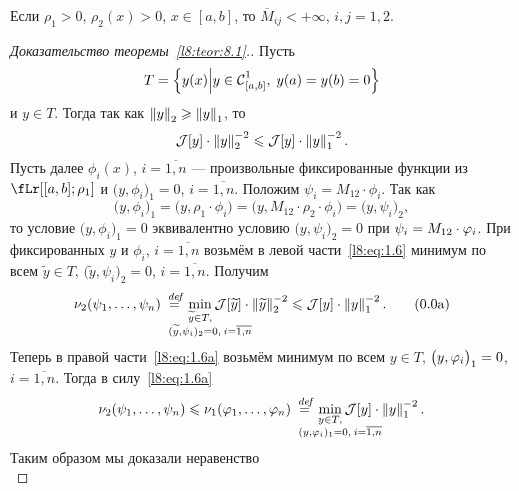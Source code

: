 \begin{_rem}
	Если $\rho_1>0$, $\rho_2(x)>0$, $x\in[a,b]$, то $\overline{M}_{ij}<+\infty$, $i,j=1,2$.
\end{_rem}
\begin{proof}[Доказательство теоремы~\ref{l8:teor:8.1}.]
	Пусть
	\begin{equation*}
		T=\left\{y(x)\middle|y\in\Cfn[{[a,b]}]{1},\;y(a)=y(b)=0\right\}
	\end{equation*}
	и $y\in T$. Тогда так как $\norm{y}_2\geqslant\norm{y}_1$, то 
	\begin{equation}\label{l8:eq:1.6}
		\J[y]\cdot\norm{y}_2^{-2}\leqslant\J[y]\cdot\norm{y}_1^{-2}.
	\end{equation}
	Пусть далее $\phi_i(x)$, $i=\overline{1,n}$ --- произвольные фиксированные функции из $\fLr[{[a,b];\rho_1}]$ и $\big(y,\phi_i\big)_1=0$, $i=\overline{1,n}$. Положим $\psi_i=M_{12}\cdot\phi_i$. Так как
	\begin{equation*}
		\big(y,\phi_i\big)_1=\big(y,\rho_1\cdot\phi_i\big)=\big(y,M_{12}\cdot\rho_2\cdot\phi_i\big)=\big(y,\psi_i\big)_2,
	\end{equation*}
	то условие $\big(y,\phi_i\big)_1=0$ эквивалентно условию $\big(y,\psi_i\big)_2=0$ при $\psi_i\?={M_{12}\cdot\phi_i}$. При фиксированных $y$ и $\phi_i$, $i=\overline{1,n}$ возьмём в левой части~\eqref{l8:eq:1.6} минимум по всем $\widetilde{y}\in T$, $\big(\widetilde{y},\psi_i\big)_2=0$, $i=\overline{1,n}$. Получим
	\begin{equation}\label{l8:eq:1.6a}
		\nu_2(\psi_1,\ldots,\psi_n)\eqdef\min\limits_{\substack{\widetilde{y}\in T,\\\lefteqn{\scriptstyle \hspace*{-0.8cm}(\widetilde{y},\psi_i)_2=0,\:i=\overline{1,n}}}}\J[\widetilde{y}]\cdot\norm{\widetilde{y}}_2^{-2}\leqslant\J[y]\cdot\norm{y}_1^{-2}. \tag{\theequation a}
	\end{equation}
	Теперь в правой части~\eqref{l8:eq:1.6a} возьмём минимум по всем $y\in T$, $\big(y,\phi_i\big)_1\?=0$, $i=\overline{1,n}$. Тогда в силу~\eqref{l8:eq:1.6a}
	\begin{equation*}
		\nu_2(\psi_1,\ldots,\psi_n)\leqslant\nu_1(\phi_1,\ldots,\phi_n)\eqdef\min\limits_{\substack{{y}\in T,\\\lefteqn{\scriptstyle \hspace*{-0.8cm}(y,\phi_i)_1=0,\:i=\overline{1,n}}}}\J[y]\cdot\norm{y}_1^{-2}.
	\end{equation*}
	Таким образом мы доказали неравенство
	\begin{equation}\label{l8:eq:1.6b}

\end{equation}
\end{proof}
